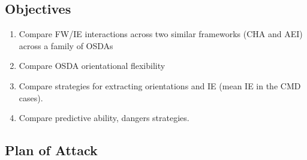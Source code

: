 \documentclass[journal=accacs,manuscript=article, email=true, layout=traditional]{achemso}
\begin{document}
\subsection{Objectives}
\label{sec:org15a0c6f}

\begin{enumerate}
\item Compare FW/IE interactions across two similar frameworks (CHA and AEI) across a family of OSDAs
\item Compare OSDA orientational flexibility
\item Compare strategies for extracting orientations and IE (mean IE in the CMD cases).
\item Compare predictive ability, dangers strategies.
\end{enumerate}

\subsection{Plan of Attack}
\label{sec:orgf3418ed}
\end{document}
